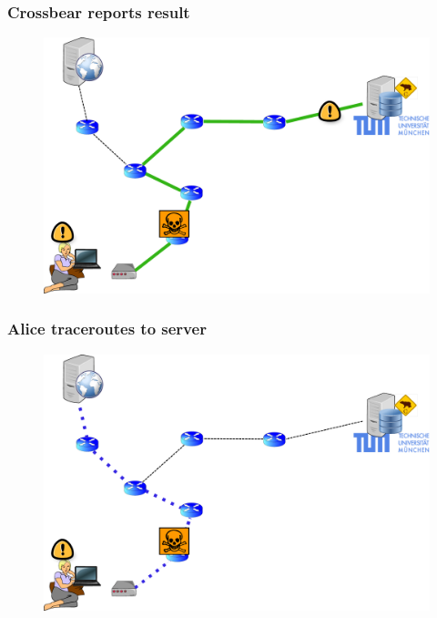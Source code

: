 \begin{frame}
\frametitle{Crossbear reports result}
  \begin{block}{}
    \vskip -1.2cm
    \begin{figure}[t]
    \centering
     \includegraphics[scale=.36]{figures/reporting-5-feedback}
    \end{figure}
  \end{block}
\end{frame}


\begin{frame}
\frametitle{Alice traceroutes to server}
  \begin{block}{}
    \vskip -1.1cm
    \begin{figure}[t]
    \centering
     \includegraphics[scale=.36]{figures/reporting-6-hunting}
    \end{figure}
  \end{block}
\end{frame}


